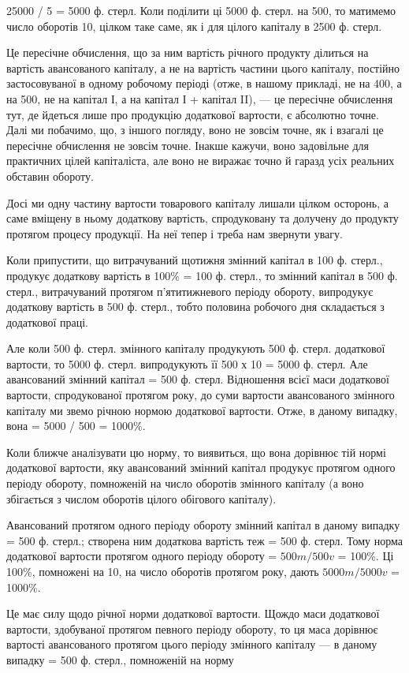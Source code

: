 \parcont{}  %
25000 / 5 = 5000 ф. стерл. Коли поділити ці 5000 ф. стерл. на 500, то матимемо число оборотів 10,
цілком таке саме, як і для цілого капіталу в 2500 ф. стерл.

Це пересічне обчислення, що за ним вартість річного продукту ділиться на вартість авансованого
капіталу, а не на вартість частини цього капіталу, постійно застосовуваної в одному робочому періоді
(отже, в нашому прикладі, не на 400, а на 500, не на капітал І, а на капітал І + капітал II), — це
пересічне обчислення тут, де йдеться лише про продукцію додаткової вартости, є абсолютно точне. Далі
ми побачимо, що, з іншого погляду, воно не зовсім точне, як і взагалі це пересічне обчислення не
зовсім точне. Інакше кажучи, воно задовільне для практичних цілей капіталіста,
але воно не виражає точно й гаразд усіх реальних обставин обороту.

Досі ми одну частину вартости товарового капіталу лишали цілком осторонь, а саме вміщену в ньому
додаткову вартість, спродуковану та долучену до продукту протягом процесу продукції. На неї тепер і
треба нам звернути увагу.

Коли припустити, що витрачуваний щотижня змінний капітал в 100 ф. стерл., продукує додаткову
вартість в 100\% = 100 ф. стерл., то змінний капітал в 500 ф. стерл.,  витрачуваний протягом
п’ятитижневого періоду обороту, випродукує додаткову вартість в 500 ф. стерл., тобто половина
робочого дня складається з додаткової праці.

Але коли 500 ф. стерл. змінного капіталу продукують 500 ф. стерл. додаткової вартости, то 5000 ф.
стерл. випродукують її 500 х 10 = 5000 ф. стерл. Але авансований змінний капітал = 500 ф. стерл.
Відношення всієї маси додаткової вартости, спродукованої протягом року, до суми вартости
авансованого змінного капіталу ми звемо річною нормою додаткової вартости. Отже, в даному випадку,
вона = 5000 / 500 = 1000\%.

Коли ближче аналізувати цю норму, то виявиться, що вона дорівнює тій нормі додаткової вартости, яку
авансований змінний капітал продукує протягом одного періоду обороту, помноженій на число оборотів
змінного капіталу (а воно збігається з числом оборотів цілого обігового капіталу).

Авансований протягом одного періоду обороту змінний капітал в даному випадку = 500 ф. стерл.;
створена ним додаткова вартість теж = 500 ф. стерл. Тому норма додаткової вартости протягом одного
періоду обороту = $500 m / 500 v$ = 100\%. Ці 100\%, помножені на 10, на число оборотів протягом року,
дають $5000 m / 5000 v$ = 1000\%.

Це має силу щодо річної норми додаткової вартости. Щождо маси додаткової вартости, здобуваної
протягом певного періоду обороту, то ця маса дорівнює вартості авансованого протягом цього періоду
змінного капіталу — в даному випадку = 500 ф. стерл., помноженій на норму
\parbreak{}  %

